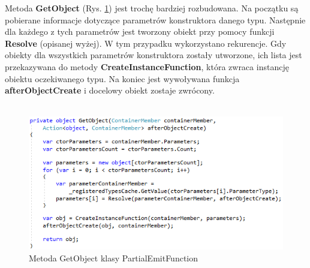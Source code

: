 \documentclass[12pt]{article}
\begin{document}
Metoda \textbf{GetObject} (Rys. \ref{fig:PartialEmitFunction_GetObject}) jest trochę bardziej rozbudowana. Na początku są pobierane informacje dotyczące parametrów konstruktora danego typu. Następnie dla każdego z tych parametrów jest tworzony obiekt przy pomocy funkcji \textbf{Resolve} (opisanej wyżej). W tym przypadku wykorzystano rekurencje. Gdy obiekty dla wszystkich parametrów konstruktora zostały utworzone, ich lista jest przekazywana do metody \textbf{CreateInstanceFunction}, która zwraca instancję obiektu oczekiwanego typu. Na koniec jest wywoływana funkcja \textbf{afterObjectCreate} i docelowy obiekt zostaje zwrócony.\\ \\
\begin{figure}[H]
	\begin{center}
  		\includegraphics{PartialEmitFunction_GetObject.png}
  		\caption{Metoda GetObject klasy PartialEmitFunction}
  		\label{fig:PartialEmitFunction_GetObject}
	\end{center}
\end{figure}
\end{document}
